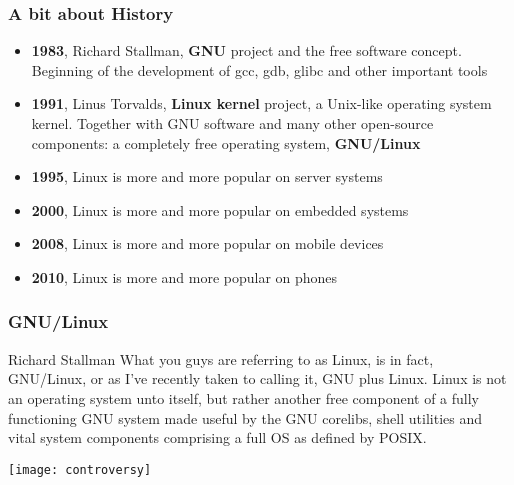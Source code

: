 \begin{frame}
  \frametitle{A bit about History}
  
    \begin{itemize}
        \item \textbf{1983}, Richard Stallman, \textbf{GNU} project and the free software
concept. Beginning of the development of gcc, gdb, glibc and
other important tools
\item \textbf{1991}, Linus Torvalds, \textbf{Linux kernel} project, a Unix-like
operating system kernel. Together with GNU software and
many other open-source components: a completely free
operating system, \textbf{GNU/Linux}
\item \textbf{1995}, Linux is more and more popular on server systems
\item \textbf{2000}, Linux is more and more popular on embedded
systems
\item \textbf{2008}, Linux is more and more popular on mobile devices
\item \textbf{2010}, Linux is more and more popular on phones
    \end{itemize}
  
  
\end{frame}



\begin{frame}
  \frametitle{GNU/Linux}
  
  \begin{block}{Richard Stallman}
   What you guys are referring to as Linux, is in fact, GNU/Linux, or as I've recently taken to calling it, GNU plus Linux. Linux is not an operating system unto itself, but rather another free component of a fully functioning GNU system made useful by the GNU corelibs, shell utilities and vital system components comprising a full OS as defined by POSIX.
  \end{block}
  
    \centering
  \texttt{[image: controversy]}
  
\end{frame}

